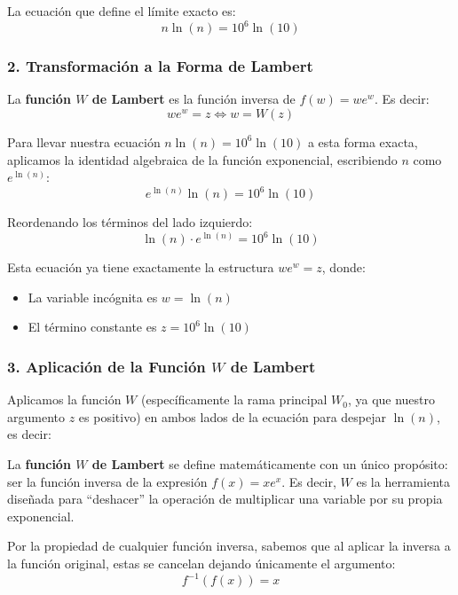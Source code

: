 \begin{enumerate}
    
    La ecuación que define el límite exacto es:
    $$n \ln(n) = 10^6 \ln(10)$$
    
    \subsubsection*{2. Transformación a la Forma de Lambert}
    La \textbf{función $W$ de Lambert} es la función inversa de $f(w) = w e^w$. Es decir:
    $$w e^w = z \iff w = W(z)$$

    Para llevar nuestra ecuación $n \ln(n) = 10^6 \ln(10)$ a esta forma exacta, aplicamos la identidad algebraica de la función exponencial, escribiendo $n$ como $e^{\ln(n)}$:
    $$e^{\ln(n)} \ln(n) = 10^6 \ln(10)$$
    
    Reordenando los términos del lado izquierdo:
    $$\ln(n) \cdot e^{\ln(n)} = 10^6 \ln(10)$$
    
    Esta ecuación ya tiene exactamente la estructura $w e^w = z$, donde:
    \begin{itemize}[leftmargin=*]
        \item La variable incógnita es $w = \ln(n)$
        \item El término constante es $z = 10^6 \ln(10)$
    \end{itemize}
    
    \subsubsection*{3. Aplicación de la Función $W$ de Lambert}
    Aplicamos la función $W$ (específicamente la rama principal $W_0$, ya que nuestro argumento $z$ es positivo) en ambos lados de la ecuación para despejar $\ln(n)$, es decir:

    \vspace{0.4cm}
    \begin{tcolorbox}[
        colback=gray!10!white,
        colframe=gray!60!black,
        fonttitle=\bfseries,
        title=Nota,
        arc=4pt,
        boxrule=0.5pt,
        left=6pt, right=6pt, top=4pt, bottom=4pt
    ]
    La \textbf{función $W$ de Lambert} se define matemáticamente con un único propósito: ser la función inversa de la expresión $f(x) = x e^x$. Es decir, $W$ es la herramienta diseñada para ``deshacer'' la operación de multiplicar una variable por su propia exponencial.
    
    Por la propiedad de cualquier función inversa, sabemos que al aplicar la inversa a la función original, estas se cancelan dejando únicamente el argumento:
    $$f^{-1}(f(x)) = x$$
    

\end{tcolorbox}
\end{enumerate}
